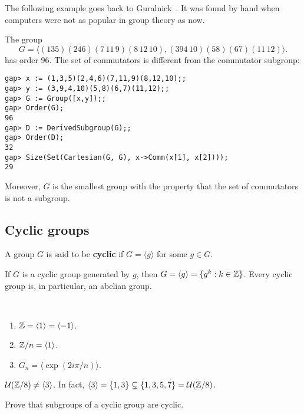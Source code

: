 The following example goes back to Guralnick~\cite{MR673806}. 
It was found by hand when computers were not as popular
in group theory as now. 

\begin{example}
The group 
\[
G=\langle (135)(246)(7\,11\,9)(8\,12\,10),(394\,10)(58)(67)(11\,12)\rangle.
\]
has order 96. The set of commutators 
is different from the commutator subgroup:
\begin{lstlisting}
gap> x := (1,3,5)(2,4,6)(7,11,9)(8,12,10);;
gap> y := (3,9,4,10)(5,8)(6,7)(11,12);;
gap> G := Group([x,y]);;
gap> Order(G);
96
gap> D := DerivedSubgroup(G);;
gap> Order(D);
32
gap> Size(Set(Cartesian(G, G), x->Comm(x[1], x[2])));
29
\end{lstlisting}
Moreover, 
$G$ is the smallest group with the property that  
the set of commutators is not a subgroup. 
\end{example}

\subsection{Cyclic groups}

\begin{definition}
        A group $G$ is said to be \textbf{cyclic} if 
        $G=\langle g\rangle$ for some 
        $g\in G$.
\end{definition}

If $G$ is a cyclic group generated by $g$, then 
$G=\langle g\rangle=\{g^k:k\in\mathbb{Z}\}$. Every cyclic group is, 
in particular, an abelian group. 

\begin{example}\
\begin{enumerate}
        \item $\mathbb{Z}=\langle 1\rangle=\langle -1\rangle$.
        \item $\mathbb{Z}/n=\langle 1\rangle$.
        \item $G_n=\langle \exp(2i\pi/n)\rangle$.
\end{enumerate}
\end{example}

\begin{example}
        $\mathcal{U}(\mathbb{Z}/8)\ne\langle 3\rangle$. In fact, $\langle 3\rangle=\{1,3\}\subsetneq\{1,3,5,7\}=\mathcal{U}(\mathbb{Z}/8)$.
\end{example}

\begin{exercise}
\label{xca:subgroups_cyclic}
        Prove that subgroups of a cyclic group are cyclic.
\end{exercise}

